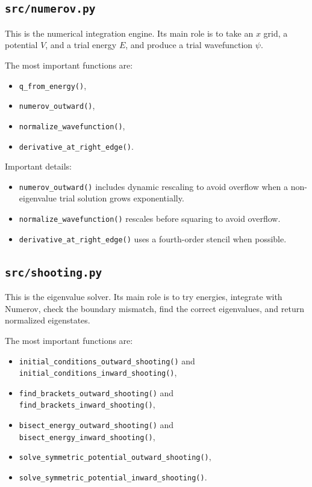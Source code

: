 \documentclass[11pt]{article}
\begin{document}
    \subsection{\texttt{src/numerov.py}}

    This is the numerical integration engine. Its main role is to take an $x$ grid, a potential $V$, and a trial energy $E$, and produce a trial wavefunction $\psi$.

    The most important functions are:
    \begin{itemize}
        \item \texttt{q\_from\_energy()},
        \item \texttt{numerov\_outward()},
        \item \texttt{normalize\_wavefunction()},
        \item \texttt{derivative\_at\_right\_edge()}.
    \end{itemize}

    Important details:
    \begin{itemize}
        \item \texttt{numerov\_outward()} includes dynamic rescaling to avoid overflow when a non-eigenvalue trial solution grows exponentially.
        \item \texttt{normalize\_wavefunction()} rescales before squaring to avoid overflow.
        \item \texttt{derivative\_at\_right\_edge()} uses a fourth-order stencil when possible.
    \end{itemize}

    \subsection{\texttt{src/shooting.py}}

    This is the eigenvalue solver. Its main role is to try energies, integrate with Numerov, check the boundary mismatch, find the correct eigenvalues, and return normalized eigenstates.

    The most important functions are:
    \begin{itemize}
        \item \texttt{initial\_conditions\_outward\_shooting()} and \texttt{initial\_conditions\_inward\_shooting()},
        \item \texttt{find\_brackets\_outward\_shooting()} and \texttt{find\_brackets\_inward\_shooting()},
        \item \texttt{bisect\_energy\_outward\_shooting()} and \texttt{bisect\_energy\_inward\_shooting()},
        \item \texttt{solve\_symmetric\_potential\_outward\_shooting()},
        \item \texttt{solve\_symmetric\_potential\_inward\_shooting()}.
    \end{itemize}
\end{document}

